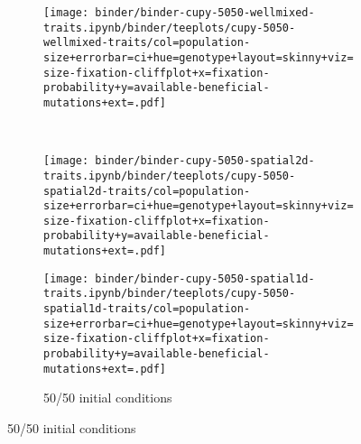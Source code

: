 \begin{figure}[h]
\begin{minipage}{\textwidth}
    \begin{subfigure}[b]{\linewidth}
        \begin{minipage}{0.3\textwidth}
          \texttt{[image: binder/binder-cupy-5050-wellmixed-traits.ipynb/binder/teeplots/cupy-5050-wellmixed-traits/col=population-size+errorbar=ci+hue=genotype+layout=skinny+viz=size-fixation-cliffplot+x=fixation-probability+y=available-beneficial-mutations+ext=.pdf]}%
        \end{minipage}%
        \begin{minipage}{0.06\textwidth}
          ~
        \end{minipage}%
        \begin{minipage}{0.26\textwidth}
          \texttt{[image: binder/binder-cupy-5050-spatial2d-traits.ipynb/binder/teeplots/cupy-5050-spatial2d-traits/col=population-size+errorbar=ci+hue=genotype+layout=skinny+viz=size-fixation-cliffplot+x=fixation-probability+y=available-beneficial-mutations+ext=.pdf]}%
        \end{minipage}%
        \begin{minipage}{0.25\textwidth}
          \texttt{[image: binder/binder-cupy-5050-spatial1d-traits.ipynb/binder/teeplots/cupy-5050-spatial1d-traits/col=population-size+errorbar=ci+hue=genotype+layout=skinny+viz=size-fixation-cliffplot+x=fixation-probability+y=available-beneficial-mutations+ext=.pdf]}%
        \end{minipage}%
      \begin{minipage}{0.12\textwidth}
        \raggedright
        \large
        \caption{50/50 initial conditions}
        \label{fig:spatial-structure-1d-uncropped:5050}
        \vspace{20ex}
      \end{minipage}%
    \end{subfigure}%

    \vspace{-10ex}


\end{minipage}
\end{figure}
